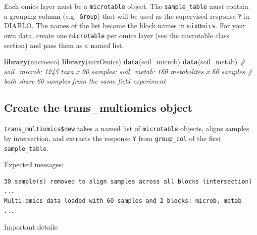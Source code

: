 \documentclass[
]{book}
\newenvironment{Shaded}{\begin{snugshade}}{\end{snugshade}}
\newcommand{\AttributeTok}[1]{\textcolor[rgb]{0.13,0.29,0.53}{#1}}
\newcommand{\CommentTok}[1]{\textcolor[rgb]{0.56,0.35,0.01}{\textit{#1}}}
\newcommand{\FunctionTok}[1]{\textcolor[rgb]{0.13,0.29,0.53}{\textbf{#1}}}
\newcommand{\NormalTok}[1]{#1}
\newcommand{\OtherTok}[1]{\textcolor[rgb]{0.56,0.35,0.01}{#1}}
\newcommand{\SpecialCharTok}[1]{\textcolor[rgb]{0.81,0.36,0.00}{\textbf{#1}}}
\newcommand{\StringTok}[1]{\textcolor[rgb]{0.31,0.60,0.02}{#1}}
\begin{document}
Each omics layer must be a \texttt{microtable} object.
The \texttt{sample\_table} must contain a grouping column (e.g.~\texttt{Group}) that will be used as the supervised response \texttt{Y} in DIABLO.
The names of the list become the block names in \texttt{mixOmics}.
For your own data, create one \texttt{microtable} per omics layer (see the microtable class section) and pass them as a named list.

\begin{Shaded}
\begin{Highlighting}[]
\FunctionTok{library}\NormalTok{(microeco)}
\FunctionTok{library}\NormalTok{(mixOmics)}
\FunctionTok{data}\NormalTok{(soil\_microb)}
\FunctionTok{data}\NormalTok{(soil\_metab)}
\CommentTok{\# soil\_microb: 1245 taxa x 90 samples; soil\_metab: 160 metabolites x 60 samples}
\CommentTok{\# both share 60 samples from the same field experiment}
\end{Highlighting}
\end{Shaded}

\subsection{Create the trans\_multiomics object}\label{create-the-trans_multiomics-object}

\texttt{trans\_multiomics\$new} takes a named list of \texttt{microtable} objects, aligns samples by intersection, and extracts the response \texttt{Y} from \texttt{group\_col} of the first \texttt{sample\_table}.

\begin{Shaded}
\end{Shaded}

Expected messages:

\begin{verbatim}
30 sample(s) removed to align samples across all blocks (intersection) ...
Multi-omics data loaded with 60 samples and 2 blocks: microb, metab ...
\end{verbatim}

Important details:
\end{document}

